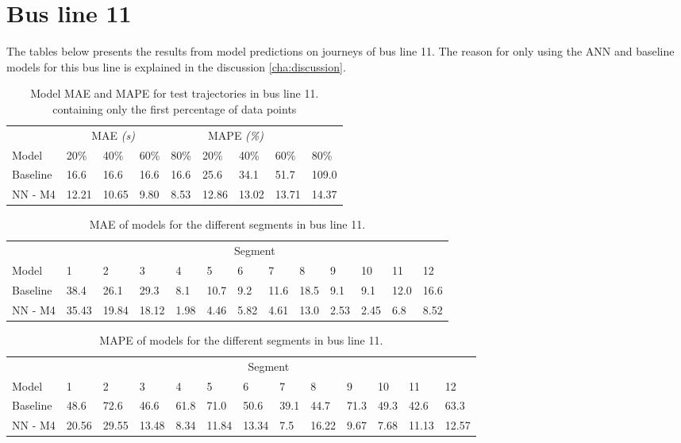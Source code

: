 \section{Bus line 11}
The tables below presents the results from model predictions on journeys of bus line 11. The reason for only using the ANN and baseline models for this bus line is explained in the discussion \ref{cha:discussion}.
\begin{table}[H]
	\centering
	\caption{Model MAE and MAPE for test trajectories in bus line 11. containing only the first percentage of data points}
	\label{tbl:models-mae-and-mape-211}
	\begin{tabular}{l | l | l | l | l || l | l | l | l }
		& \multicolumn{3}{c}{MAE \textit{(s)}} & \multicolumn{4}{c}{MAPE \textit{(\%)}} \\
		Model      & 20\% & 40\% & 60\% & 80\% & 20\% & 40\% & 60\% & 80\% \\
		\hline
		Baseline & 16.6 & 16.6 & 16.6 & 16.6  & 25.6 & 34.1 & 51.7 & 109.0 \\
		NN - M4        & 12.21 &  10.65 & 9.80 &  8.53  & 12.86 & 13.02 & 13.71 & 14.37 \\
	\end{tabular}
\end{table}

\begin{table}[H]
	\centering
	\caption{MAE of models for the different segments in bus line 11.}
	\label{tbl:model-mae-of-segs-211}
	\begin{adjustbox}{center}
	\begin{tabular}{ l | l | l | l | l | l | l | l | l | l | l | l | l}
		& \multicolumn{12}{c}{Segment} \\
		Model       & 1 & 2 & 3 & 4 & 5 & 6 & 7 & 8 & 9 & 10 & 11 & 12 \\
		\hline
		Baseline  & 38.4 & 26.1 & 29.3 & 8.1 & 10.7 & 9.2 & 11.6 & 18.5 & 9.1 & 9.1  & 12.0 & 16.6 \\
		NN - M4         & 35.43& 19.84& 18.12& 1.98& 4.46& 5.82& 4.61& 13.0& 2.53& 2.45& 6.8& 8.52\\
	\end{tabular}
	\end{adjustbox}
\end{table}

\begin{table}[H]
	\centering
	\caption{MAPE of models for the different segments in bus line 11.}
	\label{fig:model-mape-of-segs-211}
	\begin{adjustbox}{center}
	\begin{tabular}{ l | l | l | l | l | l | l | l | l | l | l | l | l}
		& \multicolumn{12}{c}{Segment} \\
		Model       & 1 & 2 & 3 & 4 & 5 & 6 & 7 & 8 & 9 & 10 & 11 & 12 \\
		\hline
		Baseline  & 48.6 & 72.6 & 46.6 & 61.8 & 71.0 & 50.6 & 39.1 & 44.7 & 71.3 & 49.3  & 42.6 & 63.3 \\
		NN - M4         & 20.56& 29.55& 13.48& 8.34& 11.84& 13.34& 7.5& 16.22& 9.67& 7.68& 11.13& 12.57\\
	\end{tabular}
	\end{adjustbox}
\end{table}

